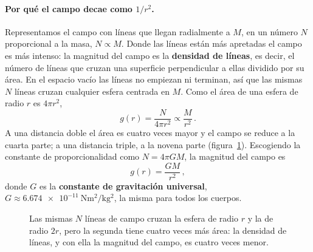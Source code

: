\documentclass[11pt,a4paper]{book}
\begin{document}
\paragraph{Por qué el campo decae como $1/r^{2}$.}
Representamos el campo con líneas que llegan radialmente a $M$, en un número
$N$ proporcional a la masa, $N \propto M$. Donde las líneas están más
apretadas el campo es más intenso: la magnitud del campo es la
\textbf{densidad de líneas}, es decir, el número de líneas que cruzan una
superficie perpendicular a ellas dividido por su área. En el espacio vacío
las líneas no empiezan ni terminan, así que las mismas $N$ líneas cruzan
cualquier esfera centrada en $M$. Como el área de una esfera de radio $r$ es
$4\pi r^{2}$,
\begin{equation}
  g(r) = \frac{N}{4\pi r^{2}} \propto \frac{M}{r^{2}} \,.
  \label{eq:densidad_lineas}
\end{equation}
A una distancia doble el área es cuatro veces mayor y el campo se reduce a la
cuarta parte; a una distancia triple, a la novena parte
(figura~\ref{fig:lineas_campo_esferas}). Escogiendo la constante de
proporcionalidad como $N = 4\pi G M$, la magnitud del campo es
\begin{equation}
  g(r) = \frac{G M}{r^{2}} \,,
  \label{eq:campo_g_r}
\end{equation}
donde $G$ es la \textbf{constante de gravitación universal},
$G \approx \SI{6.674e-11}{\newton\meter\squared\per\kilo\gram\squared}$, la
misma para todos los cuerpos.

\begin{figure}[htbp]
  \centering
  \caption{Las mismas $N$ líneas de campo cruzan la esfera de radio $r$ y la de
    radio $2r$, pero la segunda tiene cuatro veces más área: la densidad de
    líneas, y con ella la magnitud del campo, es cuatro veces menor.}
  \label{fig:lineas_campo_esferas}
\end{figure}
\end{document}

